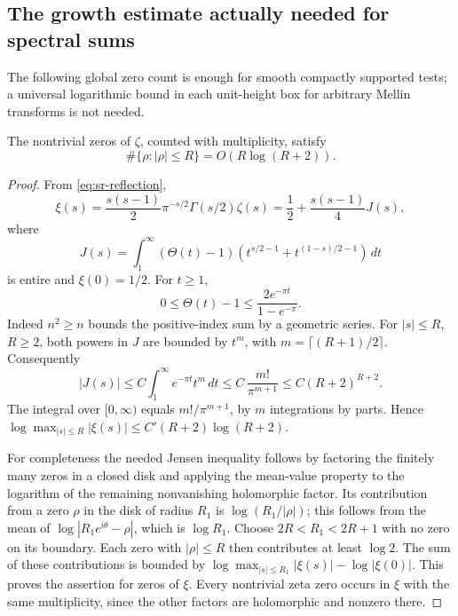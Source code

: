 \subsection{The growth estimate actually needed for spectral sums}
The following global zero count is enough for smooth compactly
supported tests; a universal logarithmic bound in each unit-height
box for arbitrary Mellin transforms is not needed.
\begin{srlemma}\label{lem:sr-global-zero-count}
The nontrivial zeros of \(\zeta\), counted with multiplicity, satisfy
\[
 \#\{\rho:|\rho|\leq R\}=O(R\log(R+2)).
\]
\end{srlemma}
\begin{proof}
From \eqref{eq:sr-reflection},
\[
 \xi(s)=\frac{s(s-1)}2\pi^{-s/2}\Gamma(s/2)\zeta(s)
  =\frac12+\frac{s(s-1)}4J(s),
\]
where
\[
 J(s)=\int_1^\infty(\Theta(t)-1)
           (t^{s/2-1}+t^{(1-s)/2-1})\,dt
\]
is entire and \(\xi(0)=1/2\).
For \(t\geq1\),
\[
 0\leq\Theta(t)-1
 \leq\frac{2e^{-\pi t}}{1-e^{-\pi}}.
\]
Indeed \(n^2\geq n\) bounds the positive-index sum by a geometric
series. For \(|s|\leq R\), \(R\geq2\), both powers in \(J\)
are bounded by \(t^m\), with \(m=\lceil(R+1)/2\rceil\).
Consequently
\[
 |J(s)|\leq C\int_1^\infty e^{-\pi t}t^m\,dt
       \leq C\,\frac{m!}{\pi^{m+1}}
       \leq C(R+2)^{R+2}.
\]
The integral over \([0,\infty)\) equals \(m!/\pi^{m+1}\), by
\(m\) integrations by parts.
Hence
\(\log\max_{|s|\leq R}|\xi(s)|\leq C'(R+2)\log(R+2)\).

For completeness the needed Jensen inequality follows by factoring
the finitely many zeros in a closed disk and applying the mean-value
property to the logarithm of the remaining nonvanishing holomorphic
factor. Its contribution from a zero \(\rho\) in the disk of radius
\(R_1\) is \(\log(R_1/|\rho|)\); this follows from
the mean of \(\log|R_1e^{i\theta}-\rho|\), which is \(\log R_1\).
Choose \(2R<R_1<2R+1\) with no zero on its boundary.
Each zero with \(|\rho|\leq R\) then contributes at least \(\log2\).
The sum of these contributions is bounded by
\(\log\max_{|s|\leq R_1}|\xi(s)|-\log|\xi(0)|\).
This proves the assertion for zeros of \(\xi\).
Every nontrivial zeta zero occurs in \(\xi\) with the same multiplicity,
since the other factors are holomorphic and nonzero there.
\end{proof}

